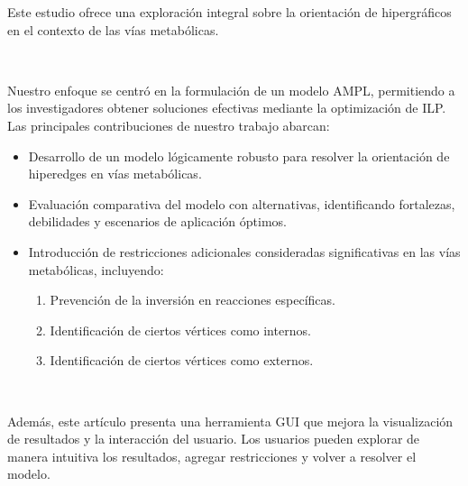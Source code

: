 Este estudio ofrece una exploración integral sobre la orientación de hipergráficos en el contexto de las vías metabólicas.

~

Nuestro enfoque se centró en la formulación de un modelo AMPL, permitiendo a los investigadores obtener soluciones efectivas mediante la optimización de ILP. Las principales contribuciones de nuestro trabajo abarcan:

\begin{itemize}
\item Desarrollo de un modelo lógicamente robusto para resolver la orientación de hiperedges en vías metabólicas.
\item Evaluación comparativa del modelo con alternativas, identificando fortalezas, debilidades y escenarios de aplicación óptimos.
\item Introducción de restricciones adicionales consideradas significativas en las vías metabólicas, incluyendo:
\begin{enumerate}[left=2em]
\item Prevención de la inversión en reacciones específicas.
\item Identificación de ciertos vértices como internos.
\item Identificación de ciertos vértices como externos.
\end{enumerate}
\end{itemize}

~

Además, este artículo presenta una herramienta GUI que mejora la visualización de resultados y la interacción del usuario. Los usuarios pueden explorar de manera intuitiva los resultados, agregar restricciones y volver a resolver el modelo.